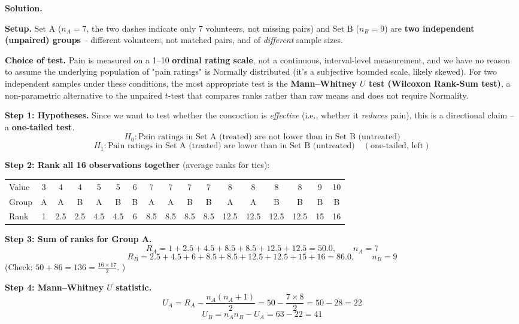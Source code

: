 \documentclass[11pt]{article}
\newcommand{\soln}{\par\noindent\textcolor{acolor}{\textbf{Solution.}}\quad}
\begin{document}
\soln

\textbf{Setup.} Set A ($n_A=7$, the two dashes indicate only 7 volunteers, not missing pairs) and Set B ($n_B=9$) are \textbf{two independent (unpaired) groups} -- different volunteers, not matched pairs, and of \emph{different} sample sizes.

\textbf{Choice of test.} Pain is measured on a 1--10 \textbf{ordinal rating scale}, not a continuous, interval-level measurement, and we have no reason to assume the underlying population of "pain ratings" is Normally distributed (it's a subjective bounded scale, likely skewed). For two independent samples under these conditions, the most appropriate test is the \textbf{Mann--Whitney $U$ test (Wilcoxon Rank-Sum test)}, a non-parametric alternative to the unpaired $t$-test that compares ranks rather than raw means and does not require Normality.

\textbf{Step 1: Hypotheses.} Since we want to test whether the concoction is \emph{effective} (i.e., whether it \emph{reduces} pain), this is a directional claim -- a \textbf{one-tailed test}.
\[
H_0: \text{Pain ratings in Set A (treated) are not lower than in Set B (untreated)}
\]
\[
H_1: \text{Pain ratings in Set A (treated) are lower than in Set B (untreated)} \quad (\text{one-tailed, left})
\]

\textbf{Step 2: Rank all 16 observations together} (average ranks for ties):

\begin{center}
\small
\begin{tabular}{l|cccccccccccccccc}
\toprule
Value & 3 & 4 & 4 & 5 & 5 & 6 & 7 & 7 & 7 & 7 & 8 & 8 & 8 & 8 & 9 & 10 \\
Group & A & A & B & A & B & B & A & A & B & B & A & A & B & B & B & B \\
Rank  & 1 & 2.5 & 2.5 & 4.5 & 4.5 & 6 & 8.5 & 8.5 & 8.5 & 8.5 & 12.5 & 12.5 & 12.5 & 12.5 & 15 & 16 \\
\bottomrule
\end{tabular}
\end{center}

\textbf{Step 3: Sum of ranks for Group A.}
\[
R_A = 1+2.5+4.5+8.5+8.5+12.5+12.5 = 50.0, \qquad n_A=7
\]
\[
R_B = 2.5+4.5+6+8.5+8.5+12.5+12.5+15+16 = 86.0, \qquad n_B=9
\]
(Check: $50+86=136=\frac{16\times17}{2}$. \checkmark)

\textbf{Step 4: Mann--Whitney $U$ statistic.}
\[
U_A = R_A - \frac{n_A(n_A+1)}{2} = 50 - \frac{7\times8}{2} = 50-28 = 22
\]
\[
U_B = n_A n_B - U_A = 63-22=41
\]
\end{document}
